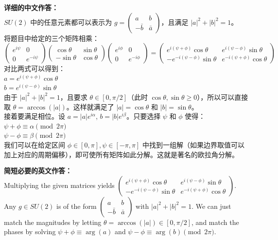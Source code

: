 \documentclass{ctexart}
\begin{document}
\vspace{1em}
\textbf{详细的中文作答：}\\
$SU(2)$ 中的任意元素都可以表示为 $g = \begin{pmatrix} a & b \\ -\bar{b} & \bar{a} \end{pmatrix}$，且满足 $|a|^2 + |b|^2 = 1$。\\
将题目中给定的三个矩阵相乘：\\
$\begin{pmatrix} e^{i\psi} & 0 \\ 0 & e^{-i\psi} \end{pmatrix} \begin{pmatrix} \cos\theta & \sin\theta \\ -\sin\theta & \cos\theta \end{pmatrix} \begin{pmatrix} e^{i\phi} & 0 \\ 0 & e^{-i\phi} \end{pmatrix} = \begin{pmatrix} e^{i(\psi+\phi)} \cos\theta & e^{i(\psi-\phi)} \sin\theta \\ -e^{-i(\psi-\phi)} \sin\theta & e^{-i(\psi+\phi)} \cos\theta \end{pmatrix}$\\
对比两式可以得到：\\
$a = e^{i(\psi+\phi)} \cos\theta$\\
$b = e^{i(\psi-\phi)} \sin\theta$\\
由于 $|a|^2 + |b|^2 = 1$，且要求 $\theta \in [0, \pi/2]$（此时 $\cos\theta, \sin\theta \ge 0$），所以可以直接取 $\theta = \arccos(|a|)$。这样就满足了 $|a| = \cos\theta$ 和 $|b| = \sin\theta$。\\
接着要满足相位。设 $a = |a|e^{i\alpha}$, $b = |b|e^{i\beta}$。只要选择 $\psi$ 和 $\phi$ 使得：\\
$\psi + \phi \equiv \alpha \pmod{2\pi}$\\
$\psi - \phi \equiv \beta \pmod{2\pi}$\\
我们可以在给定区间 $\phi \in [0, \pi], \psi \in [-\pi, \pi]$ 中找到一组解（如果边界取值可以加上对应的周期偏移），即可使所有矩阵如此分解。这就是著名的欧拉角分解。

\vspace{1em}
\textbf{简短必要的英文作答：}\\
Multiplying the given matrices yields $\begin{pmatrix} e^{i(\psi+\phi)}\cos\theta & e^{i(\psi-\phi)}\sin\theta \\ -e^{-i(\psi-\phi)}\sin\theta & e^{-i(\psi+\phi)}\cos\theta \end{pmatrix}$. Any $g \in SU(2)$ is of the form $\begin{pmatrix} a & b \\ -\bar{b} & \bar{a} \end{pmatrix}$ with $|a|^2+|b|^2=1$. We can just match the magnitudes by letting $\theta = \arccos(|a|) \in [0, \pi/2]$, and match the phases by solving $\psi+\phi \equiv \arg(a)$ and $\psi-\phi \equiv \arg(b) \pmod{2\pi}$.
\end{document}
